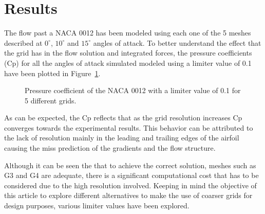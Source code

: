 
\section{Results}
The flow past a NACA 0012 has been modeled using each one of the 5 meshes described at $0^\circ$, $10^\circ$ and $15^\circ$ angles of attack. To better understand the effect that the grid has in the flow solution and integrated forces, the pressure coefficients (Cp) for all the angles of attack simulated modeled using a limiter value of 0.1 have been plotted in Figure~\ref{fig:cp_lim0.1}.

\begin{figure}[]
  \begin{subfigmatrix}{2}
    \label{fig:cp_lim0.1_AoA0}
    \label{fig:cp_lim0.1_AoA10}
  \end{subfigmatrix}
  \begin{subfigmatrix}{1}
    \label{fig:cp_lim0.1_AoA15}
  \end{subfigmatrix}
  
  \caption{Pressure coefficient of the NACA 0012 with a limiter value of 0.1 for 5 different grids.}
  \label{fig:cp_lim0.1}
\end{figure}

As can be expected, the Cp reflects that as the grid resolution increases Cp converges towards the experimental results. This behavior can be attributed to the lack of resolution mainly in the leading and trailing edges of the airfoil causing the miss prediction of the gradients and the flow structure.

Although it can be seen the that to achieve the correct solution, meshes such as G3 and G4 are adequate, there is a significant computational cost that has to be considered due to the high resolution involved. Keeping in mind the objective of this article to explore different alternatives to make the use of coarser grids for design purposes, various limiter values have been explored. 

